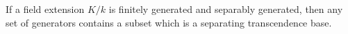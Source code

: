 If a field extension $K/k$ is finitely generated and separably generated, then any set of generators contains a subset which is a separating transcendence base.
